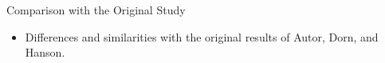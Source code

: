 \begin{frame}{Comparison with the Original Study}
    \begin{itemize}
        \item Differences and similarities with the original results of Autor, Dorn, and Hanson.
    \end{itemize}
\end{frame}